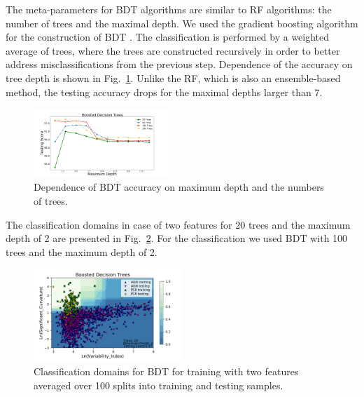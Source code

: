 \documentclass[referee]{aa} %
\newcommand{\twopicsp}{0.45}
\begin{document}
The meta-parameters for BDT algorithms are similar to RF algorithms: the number of trees and the maximal depth.
We used the gradient boosting algorithm for the construction of BDT \citep{gb}.
The classification is performed by a weighted average of trees, where the trees are constructed recursively in order to better address 
misclassifications from the previous step. 
Dependence of the accuracy on tree depth is shown in Fig.~\ref{fig:BDT_depth}. 
Unlike the RF, which is also an ensemble-based method, the testing accuracy drops for the maximal depths larger than 7. 


\begin{figure}[h]
\centering
\includegraphics[width=\twopicsp\textwidth]{plots/bdt_train_assocnewfeats.pdf}
\caption{Dependence of BDT accuracy on maximum depth and the numbers of trees.}
\label{fig:BDT_depth}
\end{figure}

The classification domains in case of two features for 20 trees and the maximum depth of 2 are presented in Fig.~\ref{fig:BDT_domains}. 
For the classification we used BDT with 100 trees and the maximum depth of 2.


\begin{figure}[h]
\centering
\includegraphics[width=0.5\textwidth]{plots/classification_domains/bdt_20_2.pdf}
\caption{Classification domains for BDT for training with two features 
averaged over 100 splits into training and testing samples.
}
\label{fig:BDT_domains}
\end{figure}
\end{document}
